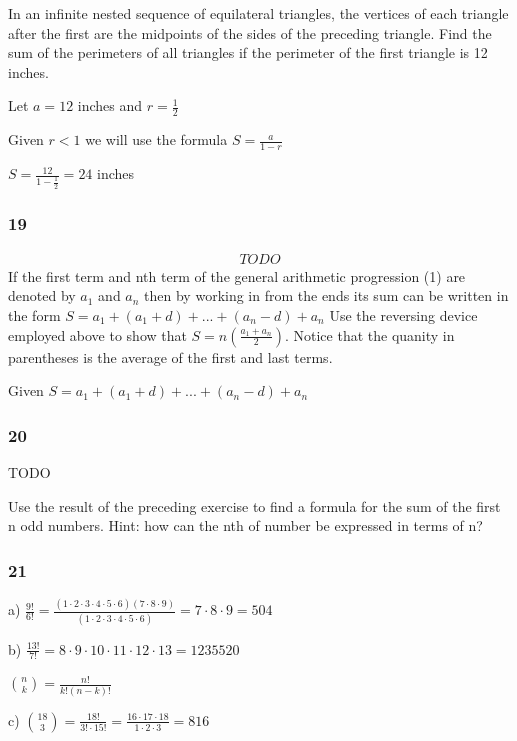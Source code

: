 \documentclass[]{report}
\begin{document}
In an infinite nested sequence of equilateral triangles, the vertices of each triangle after the first are the midpoints of the sides of the preceding triangle. Find the sum of the perimeters of all triangles if the perimeter of the first triangle is 12 inches.

Let $a=12$ inches and $r = \frac{1}{2}$

Given $r < 1$ we will use the formula $S = \frac{a}{1-r}$

$S = \frac{12}{1 - \frac{1}{2}} = 24$ inches

\subsubsection{19}

\begin{align*}
TODO
\end{align*}
If the first term and nth term of the general arithmetic progression (1) are denoted by $a_1$ and $a_n$ then by working in from the ends its sum can be written in the form $S = a_1 + (a_1 + d) + ... + (a_n - d) + a_n$ Use the reversing device employed above to show that $S = n(\frac{a_1 + a_n}{2})$. Notice that the quanity in parentheses is the average of the first and last terms.

Given $S = a_1 + (a_1 + d) + ... + (a_n - d) + a_n$

\subsubsection{20}
TODO

Use the result of the preceding exercise to find a formula for the sum of the first n odd numbers. Hint: how can the nth of number be expressed in terms of n?

\subsubsection{21}

a) $\frac{9!}{6!} = \frac{(1 \cdot 2 \cdot 3 \cdot 4 \cdot 5 \cdot 6) (7 \cdot 8 \cdot 9)}{(1 \cdot 2 \cdot 3 \cdot 4 \cdot 5 \cdot 6)} = 7 \cdot 8 \cdot 9 = 504$

b) $\frac{13!}{7!} = 8 \cdot 9 \cdot 10 \cdot 11 \cdot 12 \cdot 13 = 1235520$

${n \choose k} = \frac{n!}{k!(n-k)!}$

c) ${18 \choose 3} = \frac{18!}{3! \cdot 15!} = \frac{16 \cdot 17 \cdot 18}{1 \cdot 2 \cdot 3} = 816$
\end{document}
